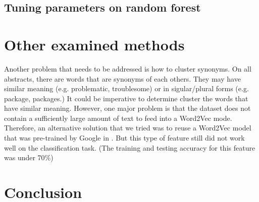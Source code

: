 \documentclass{article}
\begin{document}
\subsection{Tuning parameters on random forest}

\section{Other examined methods}
Another problem that needs to be addressed is how to cluster synonyms. On all abstracts, there are words that are synonyms of each others. They may have similar meaning (e.g. problematic, troublesome) or in sigular/plural forms (e.g. package, packages.) It could be imperative to determine cluster the words that have similar meaning. However, one major problem is that the dataset does not contain a sufficiently large amount of text to feed into a Word2Vec mode. Therefore, an alternative solution that we tried was to reuse a Word2Vec model that was pre-trained by Google in \cite{word2vecgg}. But this type of feature still did not work well on the classification task. (The training and testing accuracy for this feature was under 70$\%$)
\section{Conclusion}





\end{document}
